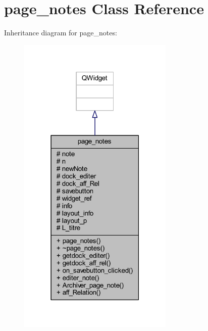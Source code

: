 \hypertarget{classpage__notes}{}\section{page\+\_\+notes Class Reference}
\label{classpage__notes}


Inheritance diagram for page\+\_\+notes\+:\nopagebreak
\begin{figure}[H]
\begin{center}
\leavevmode
\includegraphics[width=210pt]{classpage__notes__inherit__graph}
\end{center}
\end{figure}


